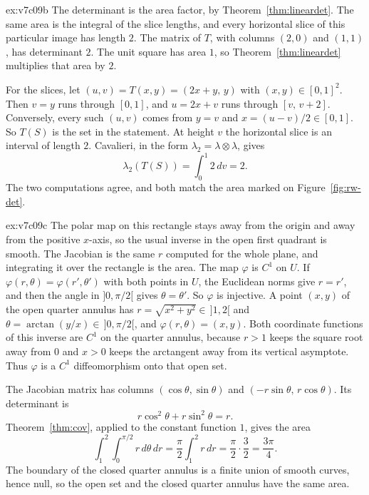 \begin{solution}{ex:v7c09b}
\idea The determinant is the area factor, by Theorem~\ref{thm:lineardet}. The same area is the integral of the slice lengths, and every horizontal slice of this particular image has length $2$.
\writeup The matrix of $T$, with columns $(2,0)$ and $(1,1)$, has determinant $2$. The unit square has area $1$, so Theorem~\ref{thm:lineardet} multiplies that area by $2$.

For the slices, let $(u,v)=T(x,y)=(2x+y,\,y)$ with $(x,y)\in[0,1]^2$. Then $v=y$ runs through $[0,1]$, and $u=2x+v$ runs through $[v,\,v+2]$. Conversely, every such $(u,v)$ comes from $y=v$ and $x=(u-v)/2\in[0,1]$. So $T(S)$ is the set in the statement. At height $v$ the horizontal slice is an interval of length $2$. Cavalieri, in the form $\lambda_2=\lambda\otimes\lambda$, gives
\[
\lambda_2(T(S))=\int_0^1 2\,dv=2.
\]
The two computations agree, and both match the area marked on Figure~\ref{fig:rw-det}.
\end{solution}

\begin{solution}{ex:v7c09c}
\idea The polar map on this rectangle stays away from the origin and away from the positive $x$-axis, so the usual inverse in the open first quadrant is smooth. The Jacobian is the same $r$ computed for the whole plane, and integrating it over the rectangle is the area.
\writeup The map $\varphi$ is $C^1$ on $U$. If $\varphi(r,\theta)=\varphi(r',\theta')$ with both points in $U$, the Euclidean norms give $r=r'$, and then the angle in $]0,\pi/2[$ gives $\theta=\theta'$. So $\varphi$ is injective. A point $(x,y)$ of the open quarter annulus has $r=\sqrt{x^2+y^2}\in\,]1,2[$ and $\theta=\arctan(y/x)\in\,]0,\pi/2[$, and $\varphi(r,\theta)=(x,y)$. Both coordinate functions of this inverse are $C^1$ on the quarter annulus, because $r>1$ keeps the square root away from $0$ and $x>0$ keeps the arctangent away from its vertical asymptote. Thus $\varphi$ is a $C^1$ diffeomorphism onto that open set.

The Jacobian matrix has columns $(\cos\theta,\sin\theta)$ and $(-r\sin\theta,\,r\cos\theta)$. Its determinant is
\[
r\cos^2\theta+r\sin^2\theta=r.
\]
Theorem~\ref{thm:cov}, applied to the constant function $1$, gives the area
\[
\int_1^2\int_0^{\pi/2} r\,d\theta\,dr=\frac\pi2\int_1^2 r\,dr=\frac\pi2\cdot\frac32=\frac{3\pi}4.
\]
The boundary of the closed quarter annulus is a finite union of smooth curves, hence null, so the open set and the closed quarter annulus have the same area.
\end{solution}


